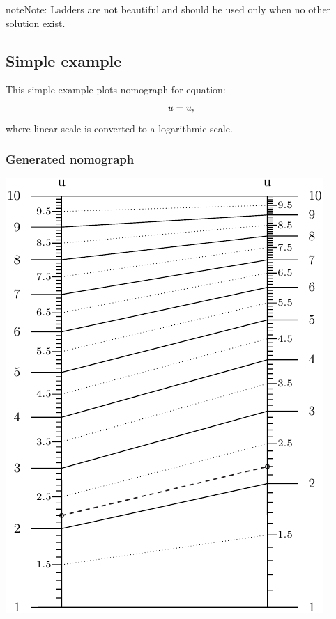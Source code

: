 \documentclass[a4paper,11pt,english]{sphinxmanual}
\begin{document}
\begin{notice}{note}{Note:}
Ladders are not beautiful and should be used only when no other solution exist.
\end{notice}


\subsection{Simple example}
\label{types/types:id26}
This simple example plots nomograph for equation:
\begin{gather}
\begin{split}u = u,\end{split}\notag
\end{gather}
where linear scale is converted to a logarithmic scale.


\subsubsection{Generated nomograph}
\label{types/types:id27}
\includegraphics{ex_type6_nomo_1.pdf}
\end{document}
